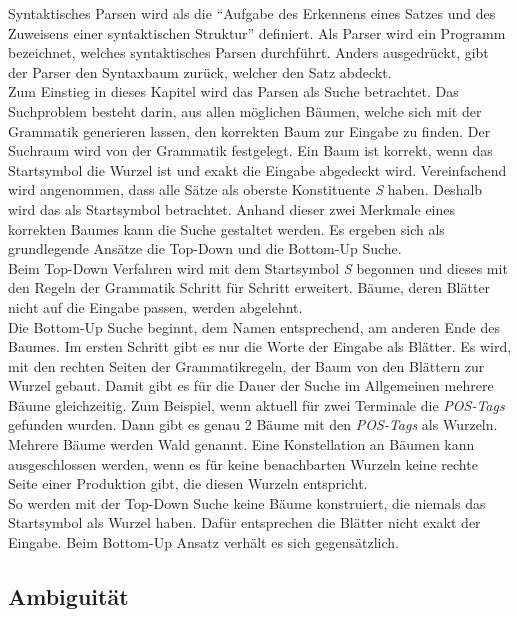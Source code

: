 Syntaktisches Parsen wird als die ``Aufgabe des Erkennens eines Satzes und des Zuweisens einer syntaktischen Struktur''\cite[S. 461]{nlpGrundlagen} definiert.
Als Parser wird ein Programm bezeichnet, welches syntaktisches Parsen durchführt. Anders ausgedrückt, gibt der Parser den Syntaxbaum zurück, welcher den Satz abdeckt. \\
Zum Einstieg in dieses Kapitel wird das Parsen als Suche betrachtet. Das Suchproblem besteht darin, aus allen möglichen Bäumen, welche sich mit der Grammatik generieren lassen, den korrekten Baum zur Eingabe zu finden. Der Suchraum wird von der Grammatik festgelegt. Ein Baum ist korrekt, wenn das Startsymbol die Wurzel ist und exakt die Eingabe abgedeckt wird. Vereinfachend wird angenommen, dass alle Sätze als oberste Konstituente \textit{S} haben. Deshalb wird das als Startsymbol betrachtet. Anhand dieser zwei Merkmale eines korrekten Baumes kann die Suche gestaltet werden. Es ergeben sich als grundlegende Ansätze die Top-Down und die Bottom-Up Suche. \\
Beim Top-Down Verfahren wird mit dem Startsymbol \textit{S} begonnen und dieses mit den Regeln der Grammatik Schritt für Schritt erweitert. Bäume, deren Blätter nicht auf die Eingabe passen, werden abgelehnt. \\
Die Bottom-Up Suche beginnt, dem Namen entsprechend, am anderen Ende des Baumes. Im ersten Schritt gibt es nur die Worte der Eingabe als Blätter. Es wird, mit den rechten Seiten der Grammatikregeln, der Baum von den Blättern zur Wurzel gebaut. Damit gibt es für die Dauer der Suche im Allgemeinen mehrere Bäume gleichzeitig. Zum Beispiel, wenn aktuell für zwei Terminale die \textit{POS-Tags} gefunden wurden. Dann gibt es genau 2 Bäume mit den \textit{POS-Tags} als Wurzeln. Mehrere Bäume werden Wald genannt.
Eine Konstellation an Bäumen kann ausgeschlossen werden, wenn es für keine benachbarten Wurzeln keine rechte Seite einer Produktion gibt, die diesen Wurzeln entspricht. \\
So werden mit der Top-Down Suche keine Bäume konstruiert, die niemals das Startsymbol als Wurzel haben. Dafür entsprechen die Blätter nicht exakt der Eingabe. Beim Bottom-Up Ansatz verhält es sich gegensätzlich.
\subsection{Ambiguität}

